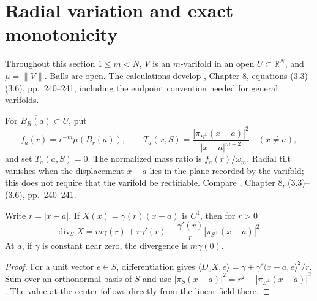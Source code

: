 \chapter{Radial variation and exact monotonicity}\label{sec:varifold-exact-monotonicity}
Throughout this section $1\leq m<N$, $V$ is an $m$-varifold in an open $U\subset\mathbb R^N$, and $\mu=\|V\|$. Balls are open. The calculations develop \cite{Sim18}, Chapter 8, equations (3.3)--(3.6), pp.~240--241, including the endpoint convention needed for general varifolds.

\begin{definition}\label{def:radial-varifold-tilt}
For $\overline{B_R(a)}\subset U$, put
\[
 f_a(r)=r^{-m}\mu(B_r(a)),\qquad
 T_a(x,S)=\frac{|\pi_{S^\perp}(x-a)|^2}{|x-a|^{m+2}}\quad(x\ne a),
\]
and set $T_a(a,S)=0$. The normalized mass ratio is $f_a(r)/\omega_m$. Radial tilt vanishes when the displacement $x-a$ lies in the plane recorded by the varifold; this does not require that the varifold be rectifiable. Compare \cite{Sim18}, Chapter 8, (3.3)--(3.6), pp.~240--241.
\end{definition}

\begin{lemma}\label{lem:radial-varifold-divergence}
Write $r=|x-a|$. If $X(x)=\gamma(r)(x-a)$ is $C^1$, then for $r>0$
\[
 \operatorname{div}_S X=m\gamma(r)+r\gamma'(r)
 -\frac{\gamma'(r)}r|\pi_{S^\perp}(x-a)|^2.
\]
At $a$, if $\gamma$ is constant near zero, the divergence is $m\gamma(0)$.
\end{lemma}
\begin{proof}
For a unit vector $e\in S$, differentiation gives
$\langle D_eX,e\rangle=\gamma+\gamma'\langle x-a,e\rangle^2/r$.
Sum over an orthonormal basis of $S$ and use
$|\pi_S(x-a)|^2=r^2-|\pi_{S^\perp}(x-a)|^2$. The value at the center follows directly from the linear field there.
\end{proof}

